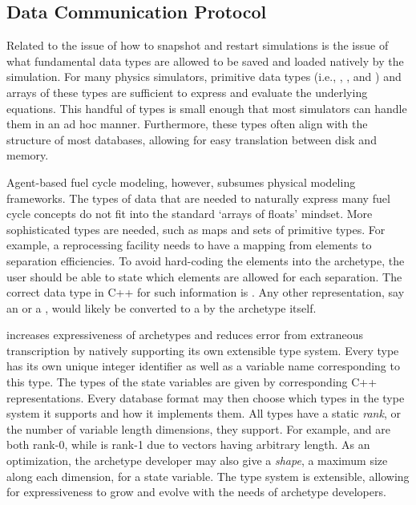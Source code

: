 \subsection{Data Communication Protocol}

Related to the issue of how to snapshot and restart simulations is the issue of 
what fundamental data types are allowed to be saved and loaded natively by the 
simulation. For many physics simulators, primitive data types (i.e., , 
, and ) and arrays of these types are sufficient to 
express and evaluate the underlying equations. This handful of types is small enough 
that most simulators can handle them in an ad hoc manner. Furthermore, these types
often align with the structure of most databases, allowing for easy translation
between disk and memory.

Agent-based fuel cycle modeling, however, subsumes physical modeling frameworks.
The types of data that are needed to naturally express many fuel cycle concepts 
do not fit into the standard `arrays of floats' mindset.  More sophisticated types are needed,
such as maps and sets of primitive types. For example, 
a reprocessing facility needs to have a mapping from elements to separation 
efficiencies. To avoid hard-coding the elements into the archetype, the user should 
be able to state which elements are allowed for each separation. The correct data
type in C++ for such information is . Any other 
representation, say an  or a ,  would likely be converted to 
a  by the archetype itself.

\Cyclus increases expressiveness of archetypes and reduces error from extraneous 
transcription by natively supporting its own extensible type system. Every type
has its own unique integer identifier as well as 
a variable name corresponding to this type. 
The types of the state variables are given by corresponding C++ representations.
Every database format may then choose which types in the type system it 
supports and how it implements them. All types have a static \emph{rank}, or the 
number of variable length dimensions, they support.  For example,  and 
 are both rank-0, while  is rank-1 due to 
vectors having arbitrary length. As an optimization, the archetype developer 
may also give a \emph{shape}, a maximum size along each dimension, for a state 
variable. The type system is extensible, 
allowing for expressiveness to grow and evolve with the needs of archetype developers.

